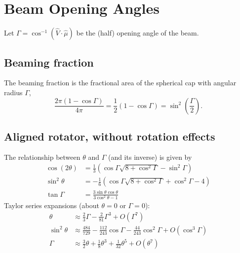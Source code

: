 \documentclass{book}
\begin{document}
\section{Beam Opening Angles}
\label{sec:beamopeningangles}

Let $\Gamma = \cos^{-1}(\hat{V}\cdot\hat{\mu})$ be the (half) opening angle of the beam.

\subsection{Beaming fraction}

The beaming fraction is the fractional area of the spherical cap with angular radius $\Gamma$,
\begin{equation}
    \frac{2\pi(1 - \cos\Gamma)}{4\pi}
        = \frac12 (1 - \cos\Gamma)
        = \sin^2\left(\frac{\Gamma}{2}\right).
\end{equation}

\subsection{Aligned rotator, without rotation effects}
The relationship between $\theta$ and $\Gamma$ (and its inverse) is given by \citet{Gangadhara2004}
\begin{equation}
    \begin{aligned}
        \cos(2\theta) &= \frac13\left(\cos\Gamma\sqrt{8 + \cos^2\Gamma} - \sin^2\Gamma\right) \\
        \sin^2\theta  &= -\frac16\left(\cos\Gamma\sqrt{8 + \cos^2\Gamma} + \cos^2\Gamma - 4\right) \\
        \tan\Gamma &= \frac{3\sin\theta\cos\theta}{3\cos^2\theta - 1}
    \end{aligned}
    \label{eqn:beam-angle-aligned-no-rotation}
\end{equation}
Taylor series expansions (about $\theta = 0$ or $\Gamma = 0$):
\begin{equation}
    \begin{aligned}
        \theta &\approx \frac23 \Gamma - \frac2{81} \Gamma^3 + O(\Gamma^7) \\
        \sin^2\theta &\approx \frac{484}{729} - \frac{112}{243}\cos\Gamma - \frac{44}{243}\cos^2\Gamma + O(\cos^3\Gamma) \\
        \Gamma &\approx \frac32 \theta + \frac18 \theta^3 + \frac1{32} \theta^5 + O(\theta^7)
    \end{aligned}
\end{equation}
\end{document}
